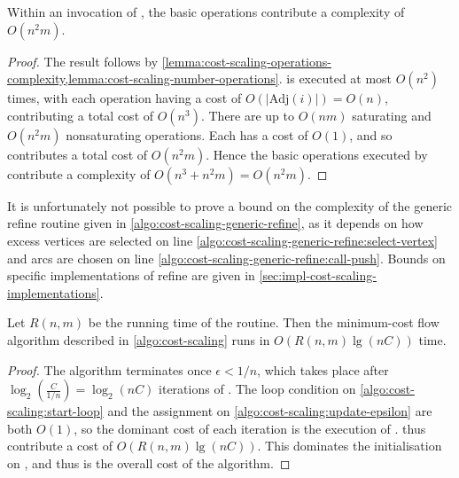 \begin{thm} \label{thm:cost-scaling-refine-complexity}
Within an invocation of , the basic operations contribute a complexity of $O(n^2m)$.
\end{thm}
\begin{proof}
The result follows by \cref{lemma:cost-scaling-operations-complexity,lemma:cost-scaling-number-operations}.  is executed at most $O(n^2)$ times, with each operation having a cost of $O\left(\left|\mathrm{Adj}(i)\right|\right) = O(n)$, contributing a total cost of $O(n^3)$. There are up to $O(nm)$ saturating and $O(n^2m)$ nonsaturating  operations. Each has a cost of $O(1)$, and so  contributes a total cost of $O(n^2m)$. Hence the basic operations executed by  contribute a complexity of $O(n^3 + n^2m) = O(n^2m)$.
\end{proof}

\begin{remark}
It is unfortunately not possible to prove a bound on the complexity of the generic refine routine given in \cref{algo:cost-scaling-generic-refine}, as it depends on how excess vertices are selected on line \cref{algo:cost-scaling-generic-refine:select-vertex} and arcs are chosen on line \cref{algo:cost-scaling-generic-refine:call-push}. Bounds on specific implementations of refine are given in \cref{sec:impl-cost-scaling-implementations}.\\
\end{remark}

\begin{thm}  \label{lemma:cost-scaling-overall-algorithm}
Let $R(n,m)$ be the running time of the  routine. Then the minimum-cost flow algorithm described in \cref{algo:cost-scaling} runs in $O\left(R(n,m)\lg(nC)\right)$ time.
\end{thm}
\begin{proof}
The algorithm terminates once $\epsilon < 1/n$, which takes place after $\log_2\left(\frac{C}{1/n}\right) = \log_2 (nC)$ iterations of . The loop condition on \cref{algo:cost-scaling:start-loop} and the assignment on \cref{algo:cost-scaling:update-epsilon} are both $O(1)$, so the dominant cost of each iteration is the execution of .  thus contribute a cost of $O\left(R(n,m)\lg(nC)\right)$. This dominates the initialisation on , and thus is the overall cost of the algorithm.
\end{proof}


